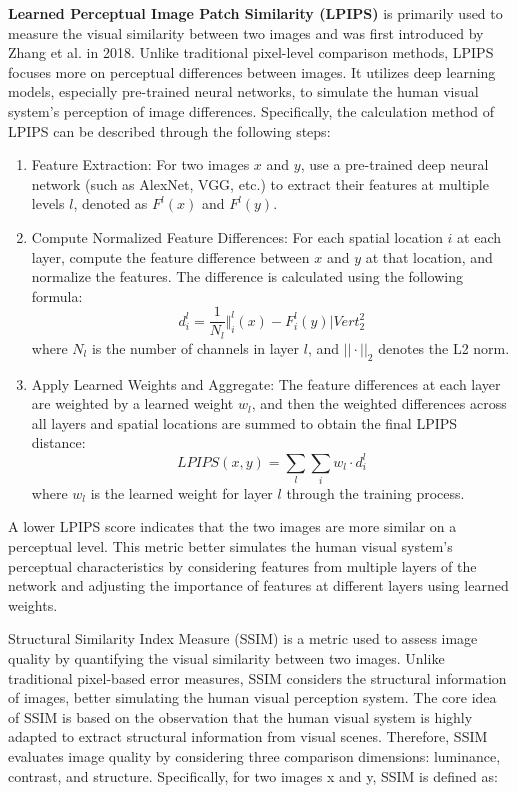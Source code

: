 \textbf{Learned Perceptual Image Patch Similarity (LPIPS)} is primarily used to measure the visual similarity between two images and was first introduced by Zhang et al. in 2018\citep{75zhang2018unreasonable}. Unlike traditional pixel-level comparison methods, LPIPS focuses more on perceptual differences between images. It utilizes deep learning models, especially pre-trained neural networks, to simulate the human visual system's perception of image differences. Specifically, the calculation method of LPIPS can be described through the following steps:
\begin{enumerate}
    \item Feature Extraction: For two images $x$ and $y$, use a pre-trained deep neural network (such as AlexNet, VGG, etc.) to extract their features at multiple levels $l$, denoted as $F^l (x)$ and $F^l (y)$.
    \item Compute Normalized Feature Differences: For each spatial location $i$ at each layer, compute the feature difference between $x$ and $y$ at that location, and normalize the features. The difference is calculated using the following formula:
    \begin{equation}
        d_i^l = \frac{1}{N_l} \Vert_i^l(x) - F_i^l(y)|Vert_2^2
    \end{equation}
    where $N_l$ is the number of channels in layer $l$, and $||\cdot||_2$ denotes the L2 norm.
    \item Apply Learned Weights and Aggregate: The feature differences at each layer are weighted by a learned weight $w_l$, and then the weighted differences across all layers and spatial locations are summed to obtain the final LPIPS distance:
    \begin{equation}
        LPIPS(x, y) = \sum_l \sum_i w_l \cdot d_i^l
    \end{equation}
    where $w_l$ is the learned weight for layer $l$ through the training process.
\end{enumerate}

A lower LPIPS score indicates that the two images are more similar on a perceptual level. This metric better simulates the human visual system's perceptual characteristics by considering features from multiple layers of the network and adjusting the importance of features at different layers using learned weights.

\textbf{}{Structural Similarity Index Measure (SSIM)} is a metric used to assess image quality by quantifying the visual similarity between two images. Unlike traditional pixel-based error measures, SSIM considers the structural information of images, better simulating the human visual perception system. The core idea of SSIM is based on the observation that the human visual system is highly adapted to extract structural information from visual scenes. Therefore, SSIM evaluates image quality by considering three comparison dimensions: luminance, contrast, and structure. Specifically, for two images x and y, SSIM is defined as:

